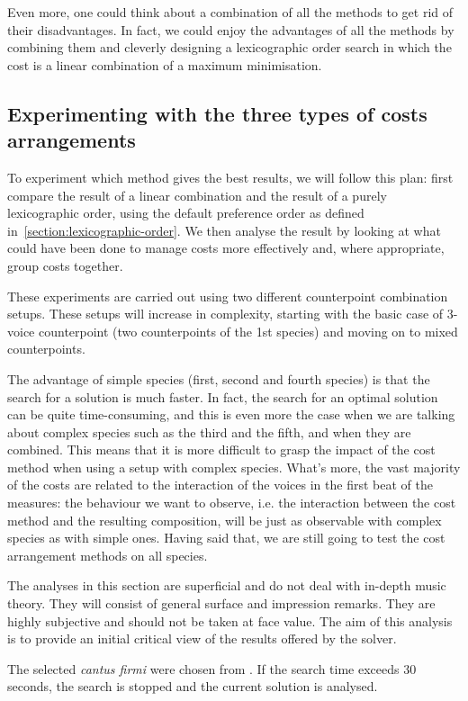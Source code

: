 Even more, one could think about a combination of all the methods to get rid of their disadvantages. In fact, we could enjoy the advantages of all the methods by combining them and cleverly designing a lexicographic order search in which the cost is a linear combination of a maximum minimisation.

\subsection{Experimenting with the three types of costs arrangements}
To experiment which method gives the best results, we will follow this plan: first compare the result of a linear combination and the result of a purely lexicographic order, using the default preference order as defined in~\ref{section:lexicographic-order}. We then analyse the result by looking at what could have been done to manage costs more effectively and, where appropriate, group costs together.


These experiments are carried out using two different counterpoint combination setups. These setups will increase in complexity, starting with the basic case of 3-voice counterpoint (two counterpoints of the 1st species) and moving on to mixed counterpoints. 

The advantage of simple species (first, second and fourth species) is that the search for a solution is much faster. In fact, the search for an optimal solution can be quite time-consuming, and this is even more the case when we are talking about complex species such as the third and the fifth, and when they are combined. This means that it is more difficult to grasp the impact of the cost method when using a setup with complex species. What's more, the vast majority of the costs are related to the interaction of the voices in the first beat of the measures: the behaviour we want to observe, i.e. the interaction between the cost method and the resulting composition, will be just as observable with complex species as with simple ones. Having said that, we are still going to test the cost arrangement methods on all species.

The analyses in this section are superficial and do not deal with in-depth music theory. They will consist of general surface and impression remarks. They are highly subjective and should not be taken at face value. The aim of this analysis is to provide an initial critical view of the results offered by the solver.

The selected \textit{cantus firmi} were chosen from \gap. If the search time exceeds 30 seconds, the search is stopped and the current solution is analysed.
